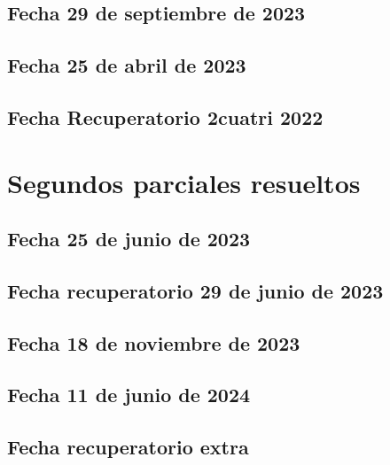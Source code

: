 \documentclass[10pt, a4paper]{report}
\begin{document}
        \section{Fecha 29 de septiembre de 2023}
            

        \newpage
        \section{Fecha 25 de abril de 2023}
            

        \newpage
        \section{Fecha Recuperatorio 2cuatri 2022}
            


        \newpage
    \chapter{Segundos parciales resueltos}
        \section{Fecha 25 de junio de 2023}
            

        \newpage
        \section{Fecha recuperatorio 29 de junio de 2023}
            

        \newpage
        \section{Fecha 18 de noviembre de 2023}
            

        \newpage
        \section{Fecha 11 de junio de 2024}
            

        \newpage
        \section{Fecha recuperatorio extra}
            
    
\end{document}
